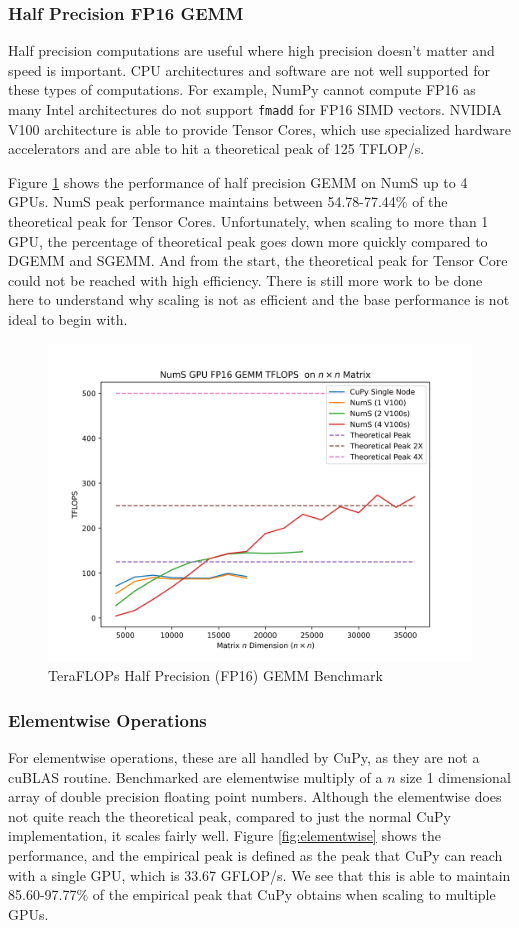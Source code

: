 \documentclass{article}
\begin{document}
\subsubsection{Half Precision FP16 GEMM}
Half precision computations are useful where high precision doesn't matter and speed is important. CPU architectures and software are not well supported for these types of computations. For example, NumPy cannot compute FP16 as many Intel architectures do not support \verb|fmadd| for FP16 SIMD vectors. NVIDIA V100 architecture is able to provide Tensor Cores, which use specialized hardware accelerators and are able to hit a theoretical peak of 125 TFLOP/s.

Figure \ref{fig:fp16gemm} shows the performance of half precision GEMM on NumS up to 4 GPUs. NumS peak performance maintains between 54.78-77.44\% of the theoretical peak for Tensor Cores. Unfortunately, when scaling to more than 1 GPU, the percentage of theoretical peak goes down more quickly compared to DGEMM and SGEMM. And from the start, the theoretical peak for Tensor Core could not be reached with high efficiency. There is still more work to be done here to understand why scaling is not as efficient and the base performance is not ideal to begin with.

\begin{figure}
  \centerline{\includegraphics[width=5in]{figures/NumS_GPU_TFLOPS_FP16GEMM.png}}
  \caption{TeraFLOPs Half Precision (FP16) GEMM Benchmark}
  \label{fig:fp16gemm}
\end{figure}

\subsubsection{Elementwise Operations}
For elementwise operations, these are all handled by CuPy, as they are not a cuBLAS routine. Benchmarked are elementwise multiply of a $n$ size 1 dimensional array of double precision floating point numbers. Although the elementwise does not quite reach the theoretical peak, compared to just the normal CuPy implementation, it scales fairly well. Figure \ref{fig:elementwise} shows the performance, and the empirical peak is defined as the peak that CuPy can reach with a single GPU, which is 33.67 GFLOP/s. We see that this is able to maintain 85.60-97.77\% of the empirical peak that CuPy obtains when scaling to multiple GPUs.
 
\end{document}
